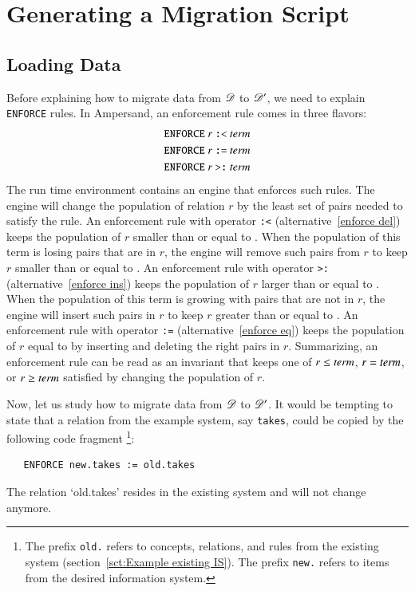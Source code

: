\documentclass{elsarticle}
\begin{document}
\section*{Generating a Migration Script}
\subsection{Loading Data}
   Before explaining how to migrate data from $\mathscr{D}$ to $\mathscr{D}'$, we need to explain {\tt ENFORCE} rules.
   In Ampersand, an enforcement rule comes in three flavors:
\begin{eqnarray}
   \text{\tt ENFORCE}\ r\ \text{\tt :<}\ \text{\it term\/}\label{enforce del}\\
   \text{\tt ENFORCE}\ r\ \text{\tt :=}\ \text{\it term\/}\label{enforce eq}\\
   \text{\tt ENFORCE}\ r\ \text{\tt >:}\ \text{\it term\/}\label{enforce ins}
\end{eqnarray}
   The run time environment contains an engine that enforces such rules.
   The engine will change the population of relation $r$ by the least set of pairs needed to satisfy the rule.
   An enforcement rule with operator {\tt :<} (alternative~\ref{enforce del}) keeps the population of $r$ smaller than or equal to .
   When the population of this term is losing pairs that are in $r$, the engine will remove such pairs from $r$ to keep $r$ smaller than or equal to .
   An enforcement rule with operator {\tt >:} (alternative~\ref{enforce ins}) keeps the population of $r$ larger than or equal to .
   When the population of this term is growing with pairs that are not in $r$, the engine will insert such pairs in $r$ to keep $r$ greater than or equal to .
   An enforcement rule with operator {\tt :=} (alternative~\ref{enforce eq}) keeps the population of $r$ equal to  by inserting and deleting the right pairs in $r$.
   Summarizing, an enforcement rule can be read as an invariant that keeps one of $r\leq\text{\it term\/}$, $r=\text{\it term\/}$, or $r\geq\text{\it term\/}$ satisfied by changing the population of $r$.

   Now, let us study how to migrate data from $\mathscr{D}$ to $\mathscr{D}'$.
   It would be tempting to state that a relation from the example system, say {\tt takes}, could be copied by the following code fragment%
\footnote{The prefix {\tt old.} refers to concepts, relations, and rules from the existing system (section~\ref{sct:Example existing IS}).
The prefix {\tt new.} refers to items from the desired information system.}:
\begin{verbatim}
   ENFORCE new.takes := old.takes
\end{verbatim}
   The relation `old.takes' resides in the existing system and will not change anymore.
   
\end{document}
